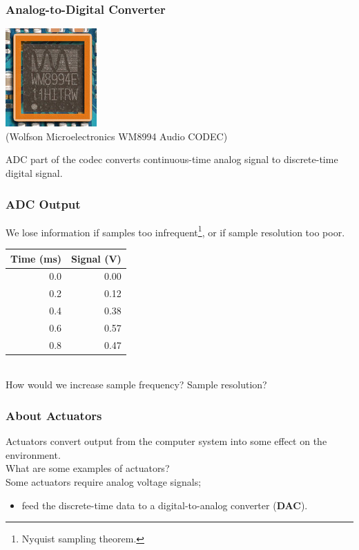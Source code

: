 \begin{frame}
\frametitle{Analog-to-Digital Converter}

\begin{center}
\includegraphics{images/codec.jpg}\\
\hfill (Wolfson Microelectronics WM8994 Audio CODEC)
\end{center}

ADC part of the codec converts continuous-time analog signal to discrete-time
digital signal.

\end{frame}

\begin{frame}
\frametitle{ADC Output}

We lose information if samples too infrequent\footnote{Nyquist sampling theorem.}, or if sample resolution too poor.

\begin{center}
\begin{tabular}{r|r}
Time (ms) & Signal (V) \\ \hline
0.0 & 0.00 \\
0.2 & 0.12 \\
0.4 & 0.38 \\
0.6 & 0.57 \\
0.8 & 0.47 \\
\end{tabular}
\end{center}

~\\[1em]
How would we increase sample frequency? Sample resolution?
\end{frame}

\begin{frame}
\frametitle{About Actuators}

Actuators convert output from the computer
system into some effect on the environment. \\[1em]

What are some examples of actuators?\\[4em] 

Some actuators require analog voltage signals;
\begin{itemize}
\item feed the discrete-time data to a digital-to-analog converter
({\bf DAC}).
\end{itemize}

\end{frame}


